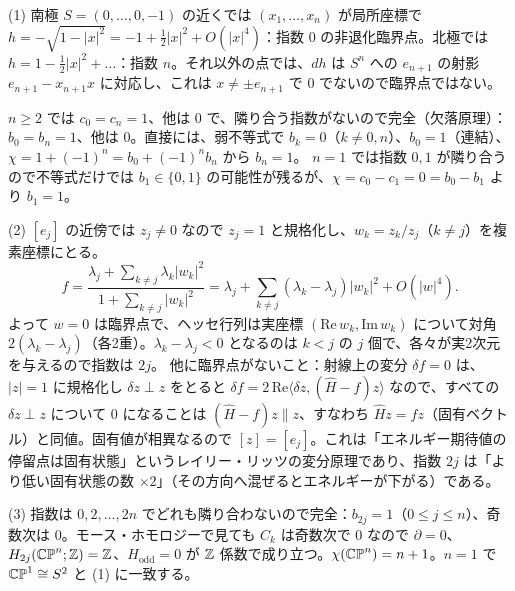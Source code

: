 \begin{solution}
(1) 南極 $S=(0,\dots,0,-1)$ の近くでは $(x_1,\dots,x_n)$ が局所座標で $h=-\sqrt{1-\lvert x\rvert^2}=-1+\tfrac12\lvert x\rvert^2+O(\lvert x\rvert^4)$：指数 $0$ の非退化臨界点。北極では $h=1-\tfrac12\lvert x\rvert^2+\dots$：指数 $n$。それ以外の点では、$dh$ は $S^n$ への $e_{n+1}$ の射影 $e_{n+1}-x_{n+1}x$ に対応し、これは $x\neq\pm e_{n+1}$ で $0$ でないので臨界点ではない。

$n\ge2$ では $c_0=c_n=1$、他は $0$ で、隣り合う指数がないので完全（欠落原理）：$b_0=b_n=1$、他は $0$。直接には、弱不等式で $b_k=0$（$k\neq0,n$）、$b_0=1$（連結）、$\chi=1+(-1)^n=b_0+(-1)^nb_n$ から $b_n=1$。
$n=1$ では指数 $0,1$ が隣り合うので不等式だけでは $b_1\in\{0,1\}$ の可能性が残るが、$\chi=c_0-c_1=0=b_0-b_1$ より $b_1=1$。

(2) $[e_j]$ の近傍では $z_j\neq0$ なので $z_j=1$ と規格化し、$w_k=z_k/z_j$（$k\neq j$）を複素座標にとる。
\[
f=\frac{\lambda_j+\sum_{k\neq j}\lambda_k\lvert w_k\rvert^2}{1+\sum_{k\neq j}\lvert w_k\rvert^2}=\lambda_j+\sum_{k\neq j}(\lambda_k-\lambda_j)\lvert w_k\rvert^2+O(\lvert w\rvert^4).
\]
よって $w=0$ は臨界点で、ヘッセ行列は実座標 $(\mathrm{Re}\,w_k,\mathrm{Im}\,w_k)$ について対角 $2(\lambda_k-\lambda_j)$（各2重）。$\lambda_k-\lambda_j<0$ となるのは $k<j$ の $j$ 個で、各々が実2次元を与えるので指数は $2j$。
他に臨界点がないこと：射線上の変分 $\delta f=0$ は、$\lvert z\rvert=1$ に規格化し $\delta z\perp z$ をとると $\delta f=2\,\mathrm{Re}\langle\delta z,(\hat H-f)z\rangle$ なので、すべての $\delta z\perp z$ について $0$ になることは $(\hat H-f)z\parallel z$、すなわち $\hat Hz=fz$（固有ベクトル）と同値。固有値が相異なるので $[z]=[e_j]$。これは「エネルギー期待値の停留点は固有状態」というレイリー・リッツの変分原理であり、指数 $2j$ は「より低い固有状態の数 $\times2$」（その方向へ混ぜるとエネルギーが下がる）である。

(3) 指数は $0,2,\dots,2n$ でどれも隣り合わないので完全：$b_{2j}=1$（$0\le j\le n$）、奇数次は $0$。モース・ホモロジーで見ても $C_k$ は奇数次で $0$ なので $\partial=0$、$H_{2j}(\mathbb{CP}^n;\mathbb{Z})=\mathbb{Z}$、$H_{\text{odd}}=0$ が $\mathbb{Z}$ 係数で成り立つ。$\chi(\mathbb{CP}^n)=n+1$。$n=1$ で $\mathbb{CP}^1\cong S^2$ と (1) に一致する。
\end{solution}


